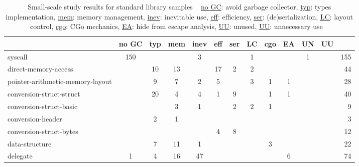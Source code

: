 \begin{table}[h]
    \caption[Small-scale study results for standard library samples]%
        {Small-scale study results for standard library samples \newline \tiny ~ \newline \small
            \underline{no GC}: avoid garbage collector, \underline{typ}: types implementation,
            \underline{mem}: memory management, \underline{inev}: inevitable use, \underline{eff}: efficiency,
            \underline{ser}: (de)serialization, \underline{LC}: layout control, \underline{cgo}: CGo mechanics,
            \underline{EA}: hide from escape analysis, \underline{UU}: unused, \underline{UU}: unnecessary use \newline \tiny ~}
    \label{tbl:survey-small-results-std}
    \begin{tabularx}{\textwidth}{Xccccccccccc|r}
        \toprule
                                          & no GC & typ & mem & inev & eff & ser & LC & cgo & EA & UN & UU &   {} \\
        \midrule
                                  syscall &   150 &     &     &    3 &     &     &  1 &     &    &  1 &    &  155 \\
        \rowcolor{verylightgray}
                     direct-memory-access &       &  10 &  13 &      &  17 &   2 &  2 &     &    &    &    &   44 \\
         pointer-arithmetic-memory-layout &       &   9 &   7 &    2 &   5 &     &  3 &   1 &  1 &    &    &   28 \\
        \rowcolor{verylightgray}
                 conversion-struct-struct &       &  20 &   4 &    4 &   1 &   9 &    &   1 &  1 &    &    &   40 \\
                  conversion-struct-basic &       &     &   3 &    1 &     &   2 &  2 &   1 &    &    &    &    9 \\
        \rowcolor{verylightgray}
                        conversion-header &       &   2 &   1 &      &     &     &    &     &    &    &    &    3 \\
                  conversion-struct-bytes &       &     &     &      &   4 &   8 &    &     &    &    &    &   12 \\
        \rowcolor{verylightgray}
                           data-structure &       &   7 &  11 &    1 &     &     &    &   3 &    &    &    &   22 \\
                                 delegate &     1 &   4 &  16 &   47 &     &     &    &     &  6 &    &    &   74 \\

\end{tabularx}
\end{table}
